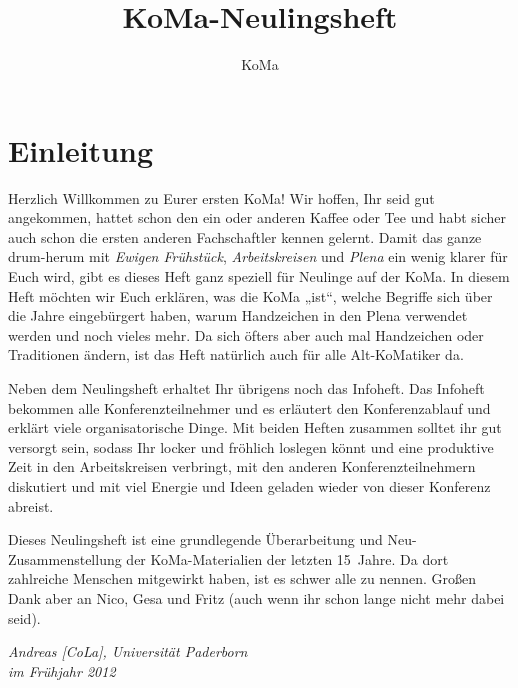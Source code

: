 \documentclass{neulingsheft}
\title{KoMa-Neulingsheft}
\author{KoMa}
\begin{document}
\chapter{Einleitung}

Herzlich Willkommen zu Eurer ersten KoMa! Wir hoffen, Ihr seid gut angekommen,
hattet schon den ein oder anderen Kaffee oder Tee und habt sicher auch schon
die ersten anderen Fachschaftler kennen gelernt. Damit das ganze drum-herum mit
\emph{Ewigen Frühstück}, \emph{Arbeitskreisen} und \emph{Plena} ein wenig
klarer für Euch wird, gibt es dieses Heft ganz speziell für Neulinge auf der
KoMa. In diesem Heft möchten wir Euch erklären, was die KoMa „ist“, welche
Begriffe sich über die Jahre eingebürgert haben, warum Handzeichen in den Plena
verwendet werden und noch vieles mehr. Da sich öfters aber auch mal Handzeichen
oder Traditionen ändern, ist das Heft natürlich auch für alle Alt-KoMatiker da.

Neben dem Neulingsheft erhaltet Ihr übrigens noch das Infoheft. Das Infoheft
bekommen alle Konferenzteilnehmer und es erläutert den Konferenzablauf und
erklärt viele organisatorische Dinge. Mit beiden Heften zusammen solltet ihr
gut versorgt sein, sodass Ihr locker und fröhlich loslegen könnt und eine
produktive Zeit in den Arbeitskreisen verbringt, mit den anderen
Konferenzteilnehmern diskutiert und mit viel Energie und Ideen geladen wieder
von dieser Konferenz abreist.

Dieses Neulingsheft ist eine grundlegende Überarbeitung und
Neu-Zusammenstellung der KoMa-Materialien der letzten 15~Jahre. Da dort
zahlreiche Menschen mitgewirkt haben, ist es schwer alle zu nennen. Großen Dank
aber an Nico, Gesa und Fritz (auch wenn ihr schon lange nicht mehr dabei seid).

\bigskip

\emph{Andreas [CoLa], Universität Paderborn} \\
\emph{im Frühjahr 2012}
\end{document}
